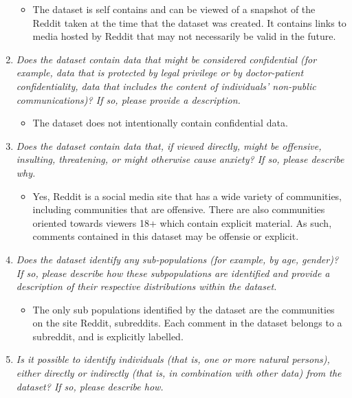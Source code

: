\documentclass[
]{article}
\providecommand{\tightlist}{%
  \setlength{\itemsep}{0pt}\setlength{\parskip}{0pt}}
\begin{document}
\begin{enumerate}
  \begin{itemize}
  \tightlist
  \item
    The dataset is self contains and can be viewed of a snapshot of the Reddit taken at the time that the dataset was created. It contains links to media hosted by Reddit that may not necessarily be valid in the future.
  \end{itemize}
\item
  \emph{Does the dataset contain data that might be considered confidential (for example, data that is protected by legal privilege or by doctor-patient confidentiality, data that includes the content of individuals' non-public communications)? If so, please provide a description.}

  \begin{itemize}
  \tightlist
  \item
    The dataset does not intentionally contain confidential data.
  \end{itemize}
\item
  \emph{Does the dataset contain data that, if viewed directly, might be offensive, insulting, threatening, or might otherwise cause anxiety? If so, please describe why.}

  \begin{itemize}
  \tightlist
  \item
    Yes, Reddit is a social media site that has a wide variety of communities, including communities that are offensive. There are also communities oriented towards viewers 18+ which contain explicit material. As such, comments contained in this dataset may be offensie or explicit.
  \end{itemize}
\item
  \emph{Does the dataset identify any sub-populations (for example, by age, gender)? If so, please describe how these subpopulations are identified and provide a description of their respective distributions within the dataset.}

  \begin{itemize}
  \tightlist
  \item
    The only sub populations identified by the dataset are the communities on the site Reddit, subreddits. Each comment in the dataset belongs to a subreddit, and is explicitly labelled.
  \end{itemize}
\item
  \emph{Is it possible to identify individuals (that is, one or more natural persons), either directly or indirectly (that is, in combination with other data) from the dataset? If so, please describe how.}


\end{enumerate}
\end{document}
